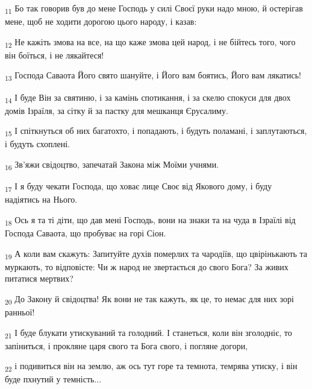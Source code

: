 \begin{tcolorbox}
\textsubscript{11} Бо так говорив був до мене Господь у силі Своєї руки надо мною, й остерігав мене, щоб не ходити дорогою цього народу, і казав:
\end{tcolorbox}
\begin{tcolorbox}
\textsubscript{12} Не кажіть змова на все, на що каже змова цей народ, і не бійтесь того, чого він боїться, і не лякайтеся!
\end{tcolorbox}
\begin{tcolorbox}
\textsubscript{13} Господа Саваота Його свято шануйте, і Його вам боятись, Його вам лякатись!
\end{tcolorbox}
\begin{tcolorbox}
\textsubscript{14} І буде Він за святиню, і за камінь спотикання, і за скелю спокуси для двох домів Ізраїля, за сітку й за пастку для мешканця Єрусалиму.
\end{tcolorbox}
\begin{tcolorbox}
\textsubscript{15} І спіткнуться об них багатохто, і попадають, і будуть поламані, і заплутаються, і будуть схоплені.
\end{tcolorbox}
\begin{tcolorbox}
\textsubscript{16} Зв'яжи свідоцтво, запечатай Закона між Моїми учнями.
\end{tcolorbox}
\begin{tcolorbox}
\textsubscript{17} І я буду чекати Господа, що ховає лице Своє від Якового дому, і буду надіятись на Нього.
\end{tcolorbox}
\begin{tcolorbox}
\textsubscript{18} Ось я та ті діти, що дав мені Господь, вони на знаки та на чуда в Ізраїлі від Господа Саваота, що пробуває на горі Сіон.
\end{tcolorbox}
\begin{tcolorbox}
\textsubscript{19} А коли вам скажуть: Запитуйте духів померлих та чародіїв, що цвірінькають та муркають, то відповісте: Чи ж народ не звертається до свого Бога? За живих питатися мертвих?
\end{tcolorbox}
\begin{tcolorbox}
\textsubscript{20} До Закону й свідоцтва! Як вони не так кажуть, як це, то немає для них зорі ранньої!
\end{tcolorbox}
\begin{tcolorbox}
\textsubscript{21} І буде блукати утискуваний та голодний. І станеться, коли він зголодніє, то запіниться, і прокляне царя свого та Бога свого, і погляне догори,
\end{tcolorbox}
\begin{tcolorbox}
\textsubscript{22} і подивиться він на землю, аж ось тут горе та темнота, темрява утиску, і він буде пхнутий у темність...
\end{tcolorbox}
